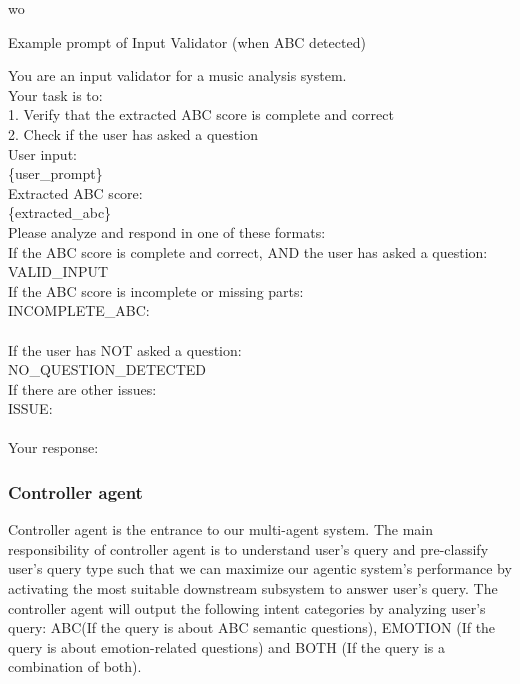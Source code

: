 wo\documentclass[sigconf]{acmart}
\begin{document}
\begin{promptbox}{Example prompt of Input Validator (when ABC detected)}

You are an input validator for a music analysis system.\\

Your task is to:\\
1. Verify that the extracted ABC score is complete and correct\\
2. Check if the user has asked a question\\

User input:\\
\{user\_prompt\}\\

Extracted ABC score:\\
\{extracted\_abc\}\\

Please analyze and respond in one of these formats:\\

If the ABC score is complete and correct, AND the user has asked a question:\\
VALID\_INPUT\\

If the ABC score is incomplete or missing parts:\\
INCOMPLETE\_ABC:\\
[description of what's missing or what should be added]\\

If the user has NOT asked a question:\\
NO\_QUESTION\_DETECTED\\

If there are other issues:\\
ISSUE:\\
[description of the issue]\\

Your response:
\end{promptbox}
\subsubsection{Controller agent}
Controller agent is the entrance to our multi-agent system. The main responsibility of controller agent is to understand user’s query and pre-classify user’s  query type such that we can maximize our agentic system’s performance by activating the most suitable downstream subsystem to answer user’s query. The controller agent will output the following intent categories by analyzing user’s query: ABC(If the query is about ABC semantic questions), EMOTION (If the query is about emotion-related questions) and BOTH (If the query is a combination of both). 
\end{document}
